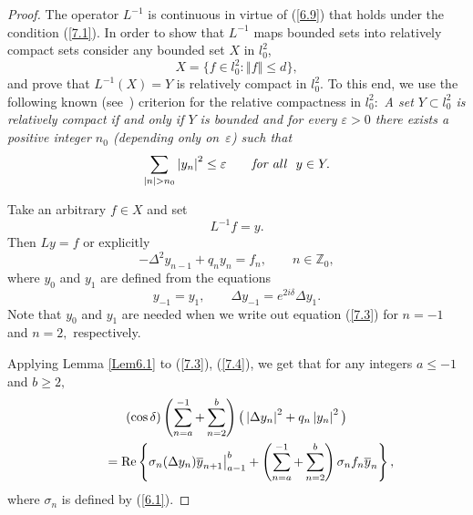 \documentclass[11pt]{article}
\numberwithin{equation}{section}
\begin{document}
\begin{proof}
The operator $L^{-1}$ is continuous in virtue of (\ref{6.9}) that holds
under the condition (\ref{7.1}). In order to show that $L^{-1}$ maps bounded
sets into relatively compact sets consider any bounded set $X$ in $l_{0}^{2}$,
\[
X=\big\{ f\in l_{0}^{2}:\left\Vert f\right\Vert \leq d\big\} ,
\]%
and prove that $L^{-1}(X)=Y$ is relatively compact in $l_{0}^{2}.$ To this
end, we use the following known (see~\cite{[17]}) criterion for the relative
compactness in $l_{0}^{2}:$ \textit{A set $Y\subset l_{0}^{2}$
is relatively compact if and only if  $Y$ is
bounded and for every $\varepsilon >0$ there exists a positive
integer $n_{0}$ (depending only on~$\varepsilon $) such
that}
\[
\sum_{\left\vert n\right\vert >n_{0}}\left\vert y_{n}\right\vert ^{2}\leq
\varepsilon \qquad \text{\textit{for all}} \ \ y\in Y.
\]

Take an arbitrary $f\in X$ and set
\[
L^{-1}f=y.
\]
Then $Ly=f$ or explicitly%
\begin{equation}
-\Delta ^{2}y_{n-1}+q_{n}y_{n}=f_{n},\qquad n\in
\mathbb{Z}
_{0},  \label{7.3}
\end{equation}%
where $y_{0}$ and $y_{1}$ are def\/ined from the equations%
\begin{equation}
y_{-1}=y_{1},\qquad \Delta y_{-1}=e^{2i\delta }\Delta y_{1}.
\label{7.4}
\end{equation}
Note that $y_{0}$ and $y_{1}$ are needed when we write out equation (\ref{7.3}) for $n=-1$ and $n=2,$ respectively.

Applying Lemma \ref{Lem6.1} to (\ref{7.3}), (\ref{7.4}), we get that for any
integers $a\leq -1$ and $b\geq 2,$%
\begin{gather}
(\cos \delta )\left( \sum_{n=a}^{-1}+\sum_{n=2}^{b}\right) \big(
\left\vert \Delta y_{n}\right\vert ^{2}+q_{n}\left\vert y_{n}\right\vert
^{2}\big)  \nonumber \\
\qquad {} ={\rm Re}\left\{ \sigma _{n}(\Delta y_{n})\overline{y}_{n+1}\big|_{a-1}^{b}+\left( \sum_{n=a}^{-1}+\sum_{n=2}^{b}\right) \sigma _{n}f_{n}%
\overline{y}_{n}\right\} ,  \label{7.5}
\end{gather}
where $\sigma _{n}$ is def\/ined by (\ref{6.1}).


\end{proof}
\end{document}
